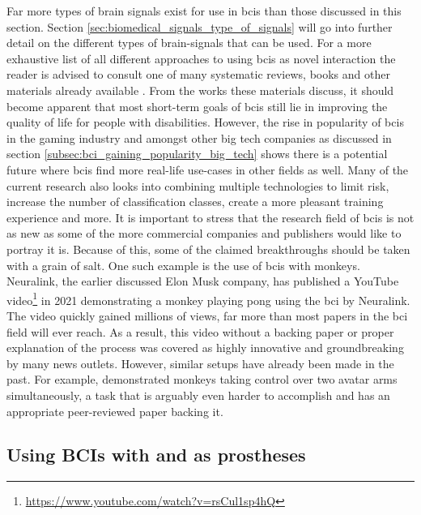 Far more types of brain signals exist for use in \glspl{bci} than those discussed in this section.
Section \ref{sec:biomedical_signals_type_of_signals} will go into further detail on the different types of brain-signals that can be used.
For a more exhaustive list of all different approaches to using \glspl{bci} as novel interaction the reader is advised to consult one of many systematic reviews, books and other materials already available \citep{bci_review_book_chapter, bci_review, bci_in_medicine, bci_history, bci_review_monkey, bci_handbook}.
From the works these materials discuss, it should become apparent that most short-term goals of \glspl{bci} still lie in improving the quality of life for people with disabilities.
However, the rise in popularity of \glspl{bci} in the gaming industry and amongst other big tech companies as discussed in section \ref{subsec:bci_gaining_popularity_big_tech} shows there is a potential future where \glspl{bci} find more real-life use-cases in other fields as well.
Many of the current research also looks into combining multiple technologies to limit risk, increase the number of classification classes, create a more pleasant training experience and more.
It is important to stress that the research field of \glspl{bci} is not as new as some of the more commercial companies and publishers would like to portray it is.
Because of this, some of the claimed breakthroughs should be taken with a grain of salt.
One such example is the use of \glspl{bci} with monkeys.
Neuralink, the earlier discussed Elon Musk company, has published a YouTube video\footnote{\url{https://www.youtube.com/watch?v=rsCul1sp4hQ}} in 2021 demonstrating a monkey playing pong using the \gls{bci} by Neuralink.
The video quickly gained millions of views, far more than most papers in the \gls{bci} field will ever reach.
As a result, this video without a backing paper or proper explanation of the process was covered as highly innovative and groundbreaking by many news outlets.
However, similar setups have already been made in the past.
For example, \citet{bci_monkey_arms} demonstrated monkeys taking control over two avatar arms simultaneously, a task that is arguably even harder to accomplish and has an appropriate peer-reviewed paper backing it.



\subsection{Using BCIs with and as prostheses}
\label{subsec:bci_helping_disabled_prostheses}

